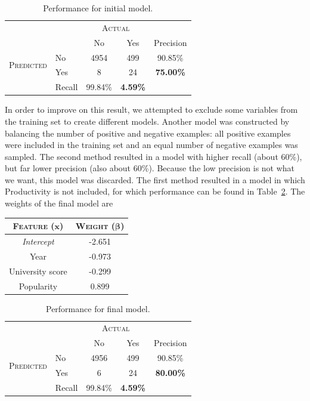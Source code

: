 \begin{table}
\centering
\begin{tabular}{c|l|c|c|c}
\multicolumn{2}{c|}{} & \multicolumn{2}{c|}{\textsc{Actual}}&\\ \cline{3-4}
\multicolumn{2}{c|}{\rule{0pt}{4mm}} &No&Yes&Precision\\ \hline
\multirow{2}{*}{\textsc{Predicted}}&\rule{0pt}{4mm}No&4954&499&90.85\%\\ \cline{2-5}
\rule{0pt}{4mm}&Yes&8&24&\textbf{75.00\%}\\ \hline
&\rule{0pt}{4mm}Recall&99.84\%&\textbf{4.59\%}&\\
\end{tabular}
\caption{Performance for initial model.}
\label{tbl:initialPerformance}
\end{table}

In order to improve on this result, we attempted to exclude some variables from the training set to create different models. Another model was constructed by balancing the number of positive and negative examples: all positive examples were included in the training set and an equal number of negative examples was sampled. The second method resulted in a model with higher recall (about 60\%), but far lower precision (also about 60\%). Because the low precision is not what we want, this model was discarded. The first method resulted in a model in which Productivity is not included, for which performance can be found in Table~\ref{tbl:resultingPerformance}. The weights of the final model are
\begin{table}[H]
\centering
\begin{tabular}{c|c}
\textsc{\textbf{Feature}} ($\mathbf{x}$) & \textsc{\textbf{Weight}} ($\boldsymbol{\beta}$)\\ \hline
\rule{0pt}{4mm}\emph{Intercept}&-2.651\\
Year&-0.973\\
University score&-0.299\\
Popularity&0.899\\
\end{tabular}
\end{table}


\begin{table}
\centering
\begin{tabular}{c|l|c|c|c}
\multicolumn{2}{c|}{} & \multicolumn{2}{c|}{\textsc{Actual}}&\\ \cline{3-4}
\multicolumn{2}{c|}{\rule{0pt}{4mm}} &No&Yes&Precision\\ \hline
\multirow{2}{*}{\textsc{Predicted}}&\rule{0pt}{4mm}No&4956&499&90.85\%\\ \cline{2-5}
\rule{0pt}{4mm}&Yes&6&24&\textbf{80.00\%}\\ \hline
&\rule{0pt}{4mm}Recall&99.84\%&\textbf{4.59\%}&\\
\end{tabular}
\caption{Performance for final model.}
\label{tbl:resultingPerformance}
\end{table}
